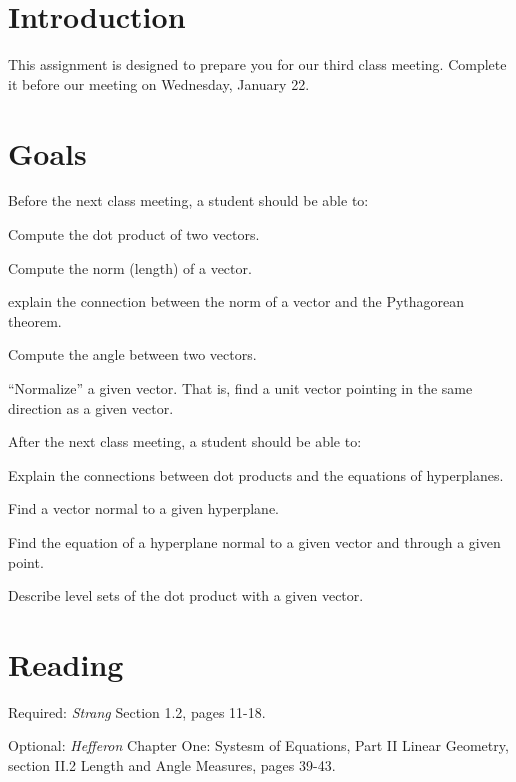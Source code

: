 \documentclass[12pt,letterpaper]{article}
\theoremstyle{definition}
\begin{document}
\setlength{\parskip}{1ex plus 0.5ex minus 0.2ex}
\setlength{\parindent}{0pt}

\pagestyle{fancy}
\cfoot{}

\section*{Introduction}
This assignment is designed to prepare you for our third class meeting.  Complete it before our meeting on Wednesday, January 22.

\section*{Goals}
Before the next class meeting, a student should be able to:
\begin{compactitem}
\item Compute the dot product of two vectors.
\item Compute the norm (length) of a vector.
\item explain the connection between the norm of a vector and the Pythagorean theorem.
\item Compute the angle between two vectors.
\item ``Normalize'' a given vector. That is, find a unit vector pointing in the same direction as a given vector.
\end{compactitem}
After the next class meeting, a student should be able to:
\begin{compactitem}
\item Explain the connections between dot products and the equations of hyperplanes.
\begin{compactitem}
\item Find a vector normal to a given hyperplane.
\item Find the equation of a hyperplane normal to a given vector and through a given point.
\end{compactitem}
\item Describe level sets of the dot product with a given vector.
\end{compactitem}

\section*{Reading}
\begin{compactdesc}
\item[Required:] \emph{Strang} Section 1.2, pages 11-18.
\item[Optional:] \emph{Hefferon} Chapter One: Systesm of Equations, Part II Linear Geometry, section II.2 Length and Angle Measures, pages 39-43.
\end{compactdesc}
\end{document}
